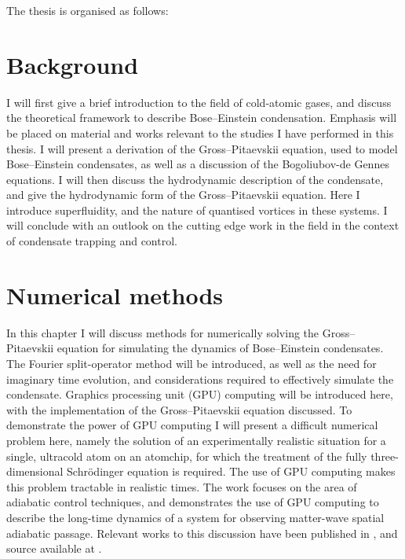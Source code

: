 The thesis is organised as follows:

\section{Background}
I will first give a brief introduction to the field of cold-atomic gases, and discuss the theoretical framework to describe Bose--Einstein condensation. Emphasis will be placed on material and works relevant to the studies I have performed in this thesis. I will present a derivation of the Gross--Pitaevskii equation, used to model Bose--Einstein condensates, as well as a discussion of the Bogoliubov-de Gennes equations. I will then discuss the hydrodynamic description of the condensate, and give the hydrodynamic form of the Gross--Pitaevskii equation. Here I introduce superfluidity, and the nature of quantised vortices in these systems. I will conclude with an outlook on the cutting edge work in the field in the context of condensate trapping and control.


\section{Numerical methods}
In this chapter I will discuss methods for numerically solving the Gross--Pitaevskii equation for simulating the dynamics of Bose--Einstein condensates. The Fourier split-operator method will be introduced, as well as the need for imaginary time evolution, and considerations required to effectively simulate the condensate. Graphics processing unit (GPU) computing will be introduced here, with the implementation of the Gross--Pitaevskii equation discussed. To demonstrate the power of GPU computing I will present a difficult numerical problem here, namely the solution of an experimentally realistic situation for a single, ultracold atom on an atomchip, for which the treatment of the fully three-dimensional Schr\"odinger equation is required. The use of GPU computing makes this problem tractable in realistic times. The work focuses on the area of adiabatic control techniques, and demonstrates the use of GPU computing to describe the long-time dynamics of a system for observing matter-wave spatial adiabatic passage. Relevant works to this discussion have been published in \cite{AO:Morgan_pra_2013}, and source available at \cite{MLXD_GPUE}.

